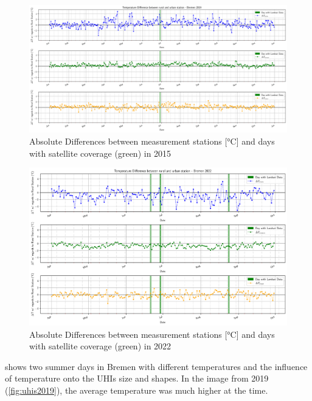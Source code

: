 \documentclass[12pt,a4paper, english,twoside]{scrartcl}
\begin{document}
      \begin{landscape}
      \begin{figure}[!p]
         \centering
          \includegraphics[width=0.89\linewidth]{img/BremenDifference2019.png}
          \caption{Absolute Differences between measurement stations [°C] and days with satellite coverage (green) in 2015}\label{fig:diff2015Bre}
      \end{figure}

      \begin{figure}[!p]
          \includegraphics[width=0.89\linewidth]{img/BremenDifferences2022.png}
          \caption{Absolute Differences between measurement stations [°C] and days with satellite coverage (green) in 2022}\label{fig:diff20222Bre}
        \end{figure}
      \end{landscape}
      \noindent
       shows two summer days in Bremen with different temperatures and the influence of temperature onto the \glspl{UHI} size and shapes. 
      In the image from 2019 (\cref{fig:uhis2019}), the average temperature was much higher at the time. 
\end{document}
